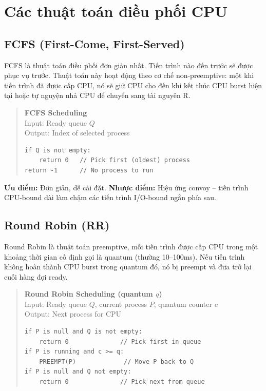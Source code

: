 \section{Các thuật toán điều phối CPU}

\subsection{FCFS (First-Come, First-Served)}

FCFS là thuật toán điều phối đơn giản nhất. Tiến trình nào đến trước sẽ được phục vụ trước. Thuật toán này hoạt động theo cơ chế non-preemptive: một khi tiến trình đã được cấp CPU, nó sẽ giữ CPU cho đến khi kết thúc CPU burst hiện tại hoặc tự nguyện nhả CPU để chuyển sang tài nguyên R.

\begin{quote}
\textbf{FCFS Scheduling}\\
Input: Ready queue $Q$\\
Output: Index of selected process\\
\begin{verbatim}
if Q is not empty:
    return 0   // Pick first (oldest) process
return -1      // No process to run
\end{verbatim}
\end{quote}

\textbf{Ưu điểm:} Đơn giản, dễ cài đặt.
\textbf{Nhược điểm:} Hiệu ứng convoy -- tiến trình CPU-bound dài làm chậm các tiến trình I/O-bound ngắn phía sau.

\subsection{Round Robin (RR)}

Round Robin là thuật toán preemptive, mỗi tiến trình được cấp CPU trong một khoảng thời gian cố định gọi là quantum (thường 10--100ms). Nếu tiến trình không hoàn thành CPU burst trong quantum đó, nó bị preempt và đưa trở lại cuối hàng đợi ready.

\begin{quote}
\textbf{Round Robin Scheduling (quantum $q$)}\\
Input: Ready queue $Q$, current process $P$, quantum counter $c$\\
Output: Next process for CPU\\
\begin{verbatim}
if P is null and Q is not empty:
    return 0              // Pick first in queue
if P is running and c >= q:
    PREEMPT(P)             // Move P back to Q
if P is null and Q not empty:
    return 0              // Pick next from queue
\end{verbatim}
\end{quote}

